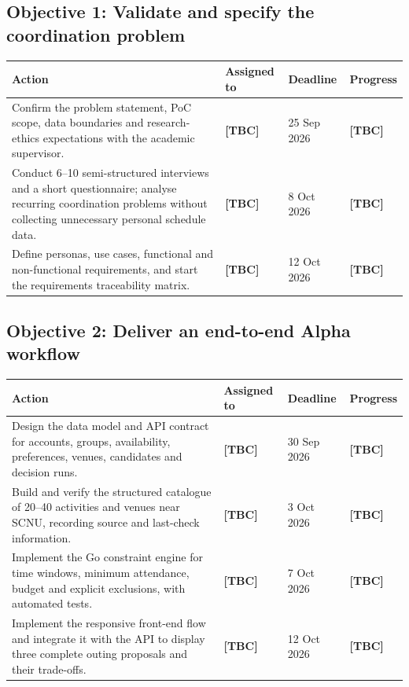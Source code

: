 \documentclass[12pt,a4paper]{article}
\newcommand{\placeholder}[1]{\textcolor{Placeholder}{\textbf{[#1]}}}
\begin{document}
\subsection*{Objective 1: Validate and specify the coordination problem}

\begin{longtable}{@{}p{}p{}p{}p{}@{}}
  \toprule
  \textbf{Action} & \textbf{Assigned to} & \textbf{Deadline} & \textbf{Progress} \\
  \midrule
  \endhead
  Confirm the problem statement, PoC scope, data boundaries and research-ethics expectations with the academic supervisor. & \placeholder{TBC} & 25 Sep 2026 & \placeholder{TBC} \\
  \midrule
  Conduct 6--10 semi-structured interviews and a short questionnaire; analyse recurring coordination problems without collecting unnecessary personal schedule data. & \placeholder{TBC} & 8 Oct 2026 & \placeholder{TBC} \\
  \midrule
  Define personas, use cases, functional and non-functional requirements, and start the requirements traceability matrix. & \placeholder{TBC} & 12 Oct 2026 & \placeholder{TBC} \\
  \bottomrule
\end{longtable}

\subsection*{Objective 2: Deliver an end-to-end Alpha workflow}

\begin{longtable}{@{}p{}p{}p{}p{}@{}}
  \toprule
  \textbf{Action} & \textbf{Assigned to} & \textbf{Deadline} & \textbf{Progress} \\
  \midrule
  \endhead
  Design the data model and API contract for accounts, groups, availability, preferences, venues, candidates and decision runs. & \placeholder{TBC} & 30 Sep 2026 & \placeholder{TBC} \\
  \midrule
  Build and verify the structured catalogue of 20--40 activities and venues near SCNU, recording source and last-check information. & \placeholder{TBC} & 3 Oct 2026 & \placeholder{TBC} \\
  \midrule
  Implement the Go constraint engine for time windows, minimum attendance, budget and explicit exclusions, with automated tests. & \placeholder{TBC} & 7 Oct 2026 & \placeholder{TBC} \\
  \midrule
  Implement the responsive front-end flow and integrate it with the API to display three complete outing proposals and their trade-offs. & \placeholder{TBC} & 12 Oct 2026 & \placeholder{TBC} \\
  \bottomrule
\end{longtable}
\end{document}
